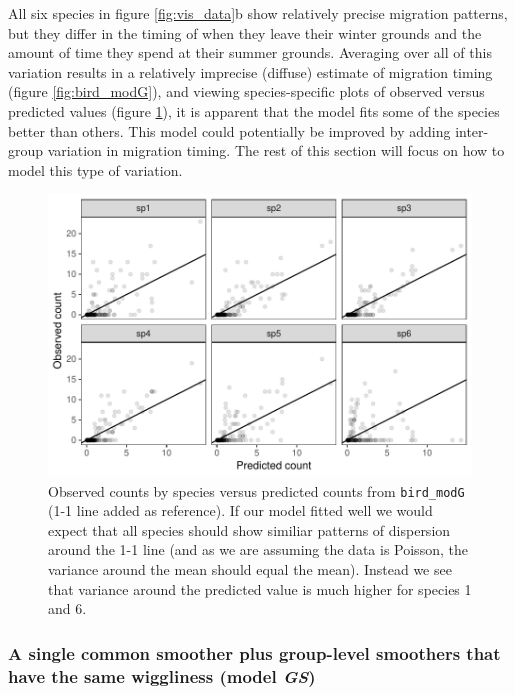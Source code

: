 \documentclass[12pt]{article}
\begin{document}
All six species in figure \ref{fig:vis_data}b show relatively precise
migration patterns, but they differ in the timing of when they leave
their winter grounds and the amount of time they spend at their summer
grounds. Averaging over all of this variation results in a relatively
imprecise (diffuse) estimate of migration timing (figure
\ref{fig:bird_modG}), and viewing species-specific plots of observed
versus predicted values (figure \ref{fig:bird-fitted-modG}), it is
apparent that the model fits some of the species better than others.
This model could potentially be improved by adding inter-group variation
in migration timing. The rest of this section will focus on how to model
this type of variation.

\begin{figure}
\includegraphics[width=\linewidth]{../figures/bird-fitted-modG-1} \caption{\label{fig:bird-fitted-modG}Observed counts by species versus predicted counts from \texttt{bird\_modG} (1-1 line added as reference). If our model fitted well we would expect that all species should show similiar patterns of dispersion around the 1-1 line (and as we are assuming the data is Poisson, the variance around the mean should equal the mean). Instead we see that variance around the predicted value is much higher for species 1 and 6.}\label{fig:bird-fitted-modG}
\end{figure}

\subsubsection{\texorpdfstring{A single common smoother plus group-level
smoothers that have the same wiggliness (model
\emph{GS})}{A single common smoother plus group-level smoothers that have the same wiggliness (model GS)}}\label{a-single-common-smoother-plus-group-level-smoothers-that-have-the-same-wiggliness-model-gs}
\end{document}
